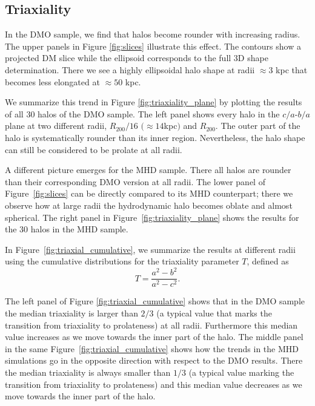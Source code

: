 \documentclass[usenatbib]{mnras}
\begin{document}
\subsection{Triaxiality}


In the DMO sample, we find that halos become rounder with increasing radius.
The upper panels in Figure \ref{fig:slices} illustrate this effect.
The contours show a projected DM slice while the ellipsoid corresponds
to the full 3D shape determination. There we see a highly ellipsoidal
halo shape at radii $\approx 3$ kpc that becomes less elongated at
$\approx 50$ kpc. 

We summarize this trend in Figure \ref{fig:triaxiality_plane} by
plotting the results of all 30 halos of the DMO sample.
The left panel shows every halo in the $c/a$-$b/a$ plane at
two different radii, $R_{200}/16$ $(\approx 14$kpc$)$ and $R_{200}$. 
The outer part of the halo is systematically rounder than its inner
region. Nevertheless, the halo shape can still be considered to be prolate at
all radii. 

A different picture emerges for the MHD sample.
There all halos are rounder than their corresponding DMO
version at all radii. The lower panel of Figure~\ref{fig:slices} can be directly compared to
its MHD counterpart; there we observe how at large radii the hydrodynamic halo
becomes oblate and almost spherical. The right panel in Figure~\ref{fig:triaxiality_plane} shows the
results for the 30 halos in the MHD sample.

In Figure~\ref{fig:triaxial_cumulative}, we summarize the results at
different radii using the cumulative distributions for the 
triaxiality parameter $T$, defined as 
\begin{equation}
T=\frac{a^2-b^2}{a^2-c^2}.
\label{eq:triaxiality}
\end{equation}

The left panel of Figure \ref{fig:triaxial_cumulative} shows that in
the DMO sample the median triaxiality is larger than $2/3$ (a
typical value that marks the transition from triaxiality to
prolateness) at all radii. Furthermore this median value increases 
as we move towards the inner part of the halo.
The middle panel in the same Figure~\ref{fig:triaxial_cumulative}
shows how the trends in the MHD simulations go 
in the opposite direction with respect to the DMO results.
There the median triaxiality is always smaller than $1/3$ (a typical
value marking the transition from triaxiality to prolateness) and this
median value decreases as we move towards the inner part of the halo.
\end{document}
